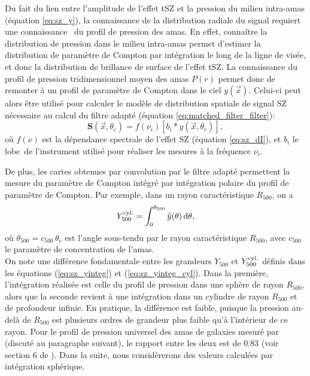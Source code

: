 Du fait du lien entre l'amplitude de l'effet tSZ et la pression du milieu intra-amas (équation \ref{eq:sz_y}), la connaissance de la distribution radiale du signal requiert une connaissance \prior\ du profil de pression des amas\footnotemark.
En effet, connaître la distribution de pression dans le milieu intra-amas permet d'estimer la distribution de paramètre de Compton par intégration le long de la ligne de visée, et donc la distribution de brillance de surface de l'effet tSZ.
La connaissance du profil de pression tridimensionnel moyen des amas $P(r)$ permet donc de remonter à un profil de paramètre de Compton dans le ciel $y(\vec{x})$.
Celui-ci peut alors être utilisé pour calculer le modèle de distribution spatiale de signal SZ nécessaire au calcul du filtre adapté (équation \ref{eq:matched_filter_filter}):
\begin{equation}
    \label{}
    \mathbf{S}(\vec{x}, \theta_c) = f(\nu_i) \left[ b_i \ast y(\vec{x}, \theta_c) \right],
\end{equation}
où $f(\nu)$ est la dépendance spectrale de l'effet SZ (équation \ref{eq:sz_dI}), et $b_i$ le lobe\footnotemark\ de l'instrument utilisé pour réaliser les mesures à la fréquence $\nu_i$.

De plus, les cartes obtenues par convolution par le filtre adapté permettent la mesure du paramètre de Compton intégré par intégration polaire du profil de paramètre de Compton.
Par exemple, dans un rayon caractéristique $R_{500}$, on a
\begin{equation}
    \label{eq:sz_yinteg_cyl}
    Y_{500}^{\rm cyl.} = \int_0^{\theta_{500}} \hat{y}(\theta) \, \mathrm{d}\theta,
\end{equation}
où $\theta_{500} = c_{500} \, \theta_c$ est l'angle sous-tendu par le rayon caractéristique $R_{500}$, avec $c_{500}$ le paramètre de concentration de l'amas. \\
On note une différence fondamentale entre les grandeurs $Y_{500}$ et $Y_{500}^{\rm cyl.}$ définis dans les équations (\ref{eq:sz_yinteg}) et (\ref{eq:sz_yinteg_cyl}).
Dans la première, l'intégration réalisée est celle du profil de pression dans une sphère de rayon $R_{500}$, alors que la seconde revient à une intégration dans un cylindre de rayon $R_{500}$ et de profondeur infinie.
En pratique, la différence est faible, puisque la pression au-delà de $R_{500}$ est plusieurs ordres de grandeur plus faible qu'à l'intérieur de ce rayon.
Pour le profil de pression universel des amas de galaxies mesuré par  (discuté au paragraphe suivant), le rapport entre les deux est de $0.83$ (voir section 6 de \cite{arnaud_universal_2010}).
Dans la suite, nous considèrerons des valeurs calculées par intégration sphérique.

